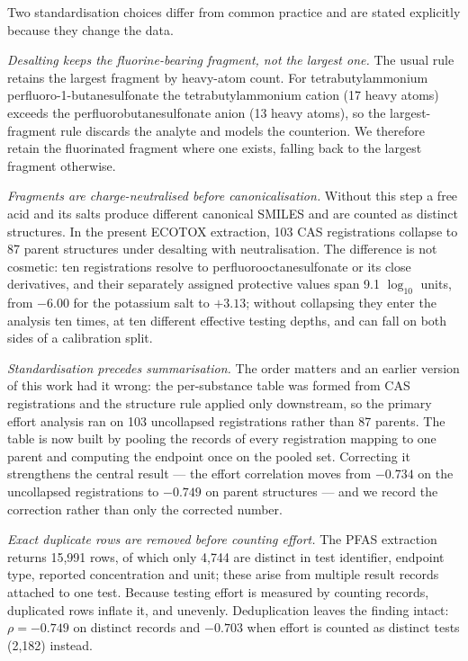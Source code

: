 \documentclass[11pt]{article}
\begin{document}
Two standardisation choices differ from common practice and are stated
explicitly because they change the data.

\emph{Desalting keeps the fluorine-bearing fragment, not the largest one.} The
usual rule retains the largest fragment by heavy-atom count. For
tetrabutylammonium perfluoro-1-butanesulfonate the tetrabutylammonium cation
(17 heavy atoms) exceeds the perfluorobutanesulfonate anion (13 heavy atoms), so
the largest-fragment rule discards the analyte and models the counterion. We
therefore retain the fluorinated fragment where one exists, falling back to the
largest fragment otherwise.

\emph{Fragments are charge-neutralised before canonicalisation.} Without this
step a free acid and its salts produce different canonical SMILES and are
counted as distinct structures. In the present ECOTOX extraction, 103 CAS
registrations collapse to 87 parent structures under desalting with
neutralisation. The difference is not cosmetic: ten registrations resolve to
per\-fluoro\-octane\-sulfonate or its close derivatives, and their separately assigned
protective values span 9.1 $\log_{10}$ units, from $-6.00$ for the potassium
salt to $+3.13$; without collapsing they enter the analysis ten times, at ten
different effective testing depths, and can fall on both sides of a calibration
split.

\emph{Standardisation precedes summarisation.} The order matters and an earlier
version of this work had it wrong: the per-substance table was formed from CAS
registrations and the structure rule applied only downstream, so the primary
effort analysis ran on 103 uncollapsed registrations rather than 87 parents. The
table is now built by pooling the records of every registration mapping to one
parent and computing the endpoint once on the pooled set. Correcting it
strengthens the central result --- the effort correlation moves from $-0.734$ on
the uncollapsed registrations to $-0.749$ on parent structures --- and we record
the correction rather than only the corrected number.

\emph{Exact duplicate rows are removed before counting effort.} The PFAS
extraction returns 15{,}991 rows, of which only 4{,}744 are distinct in test
identifier, endpoint type, reported concentration and unit; these arise from
multiple result records attached to one test. Because testing effort is measured
by counting records, duplicated rows inflate it, and unevenly. Deduplication
leaves the finding intact: $\rho=-0.749$ on distinct records and $-0.703$ when
effort is counted as distinct tests (2{,}182) instead.
\end{document}
